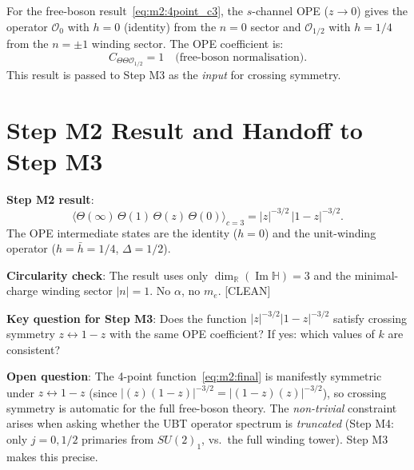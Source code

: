 \documentclass[12pt,a4paper]{article}
\theoremstyle{definition}
\theoremstyle{remark}
\begin{document}
For the free-boson result~\eqref{eq:m2:4point_c3}, the $s$-channel OPE
($z \to 0$) gives the operator $\mathcal{O}_0$ with $h = 0$ (identity) from the
$n = 0$ sector and $\mathcal{O}_{1/2}$ with $h = 1/4$ from the $n = \pm 1$
winding sector.  The OPE coefficient is:
\begin{equation}
  C_{\Theta\Theta\mathcal{O}_{1/2}}
  = 1 \quad \text{(free-boson normalisation)}.
  \label{eq:m2:ope_coeff}
\end{equation}
This result is passed to Step M3 as the \emph{input} for crossing symmetry.

\section{Step M2 Result and Handoff to Step M3}
\label{sec:m2:result}

\begin{resultbox}
\textbf{Step M2 result}:
\begin{equation}
  \bigl\langle \Theta(\infty)\, \Theta(1)\, \Theta(z)\, \Theta(0)
  \bigr\rangle_{c=3}
  = |z|^{-3/2}\, |1 - z|^{-3/2}.
  \label{eq:m2:final}
\end{equation}
The OPE intermediate states are the identity ($h = 0$) and the unit-winding
operator ($h = \bar{h} = 1/4$, $\Delta = 1/2$).

\textbf{Circularity check}: The result uses only
$\dim_{\mathbb{R}}(\operatorname{Im}\mathbb{H}) = 3$ and the minimal-charge
winding sector $|n| = 1$.  No $\alpha$, no $m_e$.  [CLEAN]

\textbf{Key question for Step M3}: Does the function $|z|^{-3/2}|1-z|^{-3/2}$
satisfy crossing symmetry $z \leftrightarrow 1-z$ with the same OPE coefficient?
If yes: which values of $k$ are consistent?
\end{resultbox}

\begin{gapbox}
\textbf{Open question}: The 4-point function~\eqref{eq:m2:final} is manifestly
symmetric under $z \leftrightarrow 1-z$ (since
$|(z)(1-z)|^{-3/2} = |(1-z)(z)|^{-3/2}$), so crossing symmetry is automatic
for the full free-boson theory.  The \emph{non-trivial} constraint arises
when asking whether the UBT operator spectrum is \emph{truncated} (Step M4:
only $j = 0, 1/2$ primaries from $SU(2)_1$, vs.\ the full winding tower).
Step M3 makes this precise.
\end{gapbox}

\ifdefined\INCLUDEMODE
\else
  
\end{document}
